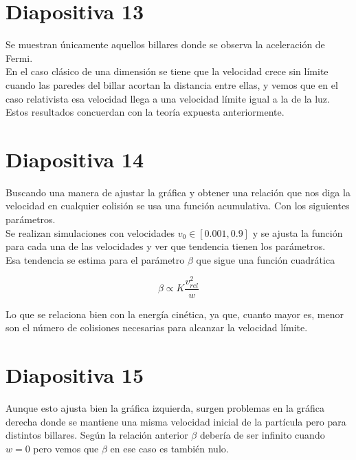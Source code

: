 \documentclass[11pt, spanish]{article}
\begin{document}
\section{Diapositiva 13}

Se muestran únicamente aquellos billares donde se observa la aceleración de Fermi. \\

En el caso clásico de una dimensión se tiene que la velocidad crece sin límite cuando las paredes del billar acortan la distancia entre ellas, y vemos que en el caso relativista esa velocidad llega a una velocidad límite igual a la de la luz. Estos resultados concuerdan con la teoría expuesta anteriormente.

\section{Diapositiva 14}

Buscando una manera de ajustar la gráfica y obtener una relación que nos diga la velocidad en cualquier colisión se usa una función acumulativa. Con los siguientes parámetros. \\

Se realizan simulaciones con velocidades \( v_0 \in [0.001, 0.9] \) y se ajusta la función para cada una de las velocidades y ver que tendencia tienen los parámetros. \\

Esa tendencia se estima para el parámetro \( \beta \) que sigue una función cuadrática 

\begin{equation}
    \beta \propto K \dfrac{v^2_{rel}}{w}
\end{equation}

Lo que se relaciona bien con la energía cinética, ya que, cuanto mayor es, menor son el número de colisiones necesarias para alcanzar la velocidad límite. \\

\section{Diapositiva 15}

Aunque esto ajusta bien la gráfica izquierda, surgen problemas en la gráfica derecha donde se mantiene una misma velocidad inicial de la partícula pero para distintos billares. Según la relación anterior \( \beta \) debería de ser infinito cuando \( w=0 \) pero vemos que \( \beta \) en ese caso es también nulo. \\
\end{document}
